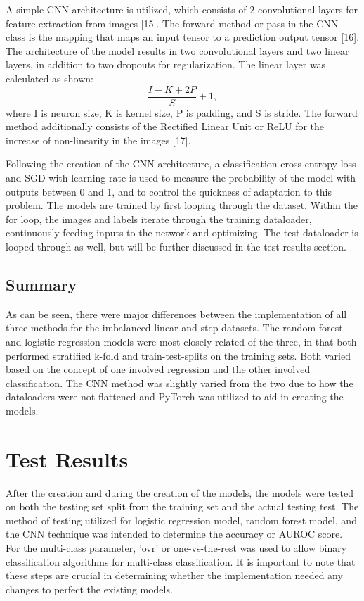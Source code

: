 \documentclass[conference]{IEEEtran}
\begin{document}
A simple CNN architecture is utilized, which consists of 2 convolutional layers for feature extraction from images [15]. The forward method or pass in the CNN class is the mapping that maps an input tensor to a prediction output tensor [16]. The architecture of the model results in two convolutional layers and two linear layers, in addition to two dropouts for regularization. The linear layer was calculated as shown: 
\begin{equation}
\frac{I - K + 2P}{S} + 1, \label{eq}
\end{equation}
where I is neuron size, K is kernel size, P is padding, and S is stride. The forward method additionally consists of the Rectified Linear Unit or ReLU for the increase of non-linearity in the images [17].

Following the creation of the CNN architecture, a classification cross-entropy loss and SGD with learning rate is used to measure the probability of the model with outputs between 0 and 1, and to control the quickness of adaptation to this problem. The models are trained by first looping through the dataset. Within the for loop, the images and labels iterate through the training dataloader, continuously feeding inputs to the network and optimizing. The test dataloader is looped through as well, but will be further discussed in the test results section. 

\subsection{Summary}
As can be seen, there were major differences between the implementation of all three methods for the imbalanced linear and step datasets. The random forest and logistic regression models were most closely related of the three, in that both performed stratified k-fold and train-test-splits on the training sets. Both varied based on the concept of one involved regression and the other involved classification. The CNN method was slightly varied from the two due to how the dataloaders were not flattened and PyTorch was utilized to aid in creating the models. 

\section{Test Results}

After the creation and during the creation of the models, the models were tested on both the testing set split from the training set and the actual testing test. The method of testing utilized for logistic regression model, random forest model, and the CNN technique was intended to determine the accuracy or AUROC score. For the multi-class parameter, 'ovr' or one-vs-the-rest was used to allow binary classification algorithms for multi-class classification. It is important to note that these steps are crucial in determining whether the implementation needed any changes to perfect the existing models.  
\end{document}
